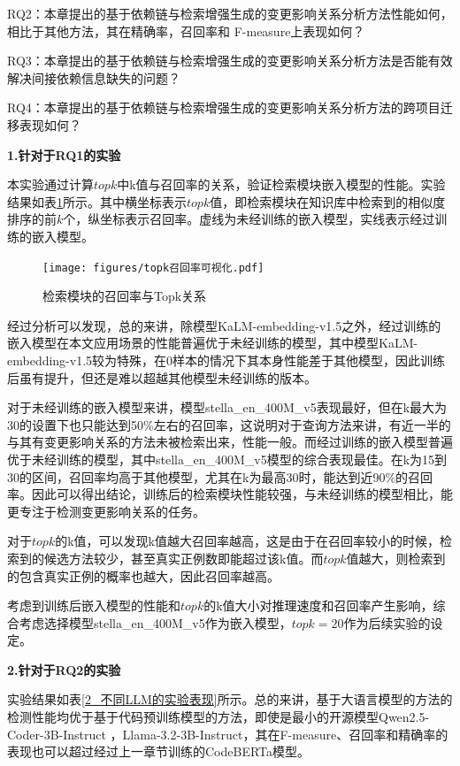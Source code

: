 RQ2：本章提出的基于依赖链与检索增强生成的变更影响关系分析方法性能如何，相比于其他方法，其在精确率，召回率和 F-measure上表现如何？

RQ3：本章提出的基于依赖链与检索增强生成的变更影响关系分析方法是否能有效解决间接依赖信息缺失的问题？

RQ4：本章提出的基于依赖链与检索增强生成的变更影响关系分析方法的跨项目迁移表现如何？
 

\textbf{1.针对于RQ1的实验}

本实验通过计算$topk$中k值与召回率的关系，验证检索模块嵌入模型的性能。实验结果如表\ref{1_检索模块的召回率与Topk的关系可视化}所示。其中横坐标表示$topk$值，即检索模块在知识库中检索到的相似度排序的前$k$个，纵坐标表示召回率。虚线为未经训练的嵌入模型，实线表示经过训练的嵌入模型。

\begin{figure}[htbp]
\centering
\texttt{[image: figures/topk召回率可视化.pdf]}
\caption{检索模块的召回率与Topk关系}
\label{1_检索模块的召回率与Topk的关系可视化}
\end{figure}

经过分析可以发现，总的来讲，除模型KaLM-embedding-v1.5之外，经过训练的嵌入模型在本文应用场景的性能普遍优于未经训练的模型，其中模型KaLM-embedding-v1.5较为特殊，在0样本的情况下其本身性能差于其他模型，因此训练后虽有提升，但还是难以超越其他模型未经训练的版本。

对于未经训练的嵌入模型来讲，模型stella\_en\_400M\_v5表现最好，但在k最大为30的设置下也只能达到50\%左右的召回率，这说明对于查询方法来讲，有近一半的与其有变更影响关系的方法未被检索出来，性能一般。而经过训练的嵌入模型普遍优于未经训练的模型，其中stella\_en\_400M\_v5模型的综合表现最佳。在k为15到30的区间，召回率均高于其他模型，尤其在k为最高30时，能达到近90\%的召回率。因此可以得出结论，训练后的检索模块性能较强，与未经训练的模型相比，能更专注于检测变更影响关系的任务。

对于$topk$的k值，可以发现k值越大召回率越高，这是由于在召回率较小的时候，检索到的候选方法较少，甚至真实正例数即能超过该k值。而$topk$值越大，则检索到的包含真实正例的概率也越大，因此召回率越高。


考虑到训练后嵌入模型的性能和$topk$的k值大小对推理速度和召回率产生影响，综合考虑选择模型stella\_en\_400M\_v5作为嵌入模型，$topk=20$作为后续实验的设定。 

\textbf{2.针对于RQ2的实验}

实验结果如表\ref{2_不同LLM的实验表现}所示。总的来讲，基于大语言模型的方法的检测性能均优于基于代码预训练模型的方法，即使是最小的开源模型Qwen2.5-Coder-3B-Instruct ，Llama-3.2-3B-Instruct，其在F-measure、召回率和精确率的表现也可以超过经过上一章节训练的CodeBERTa模型。


